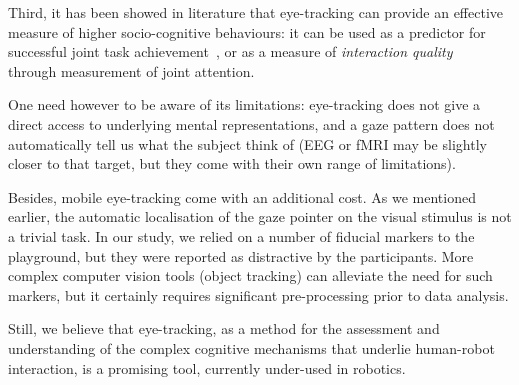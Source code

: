 \documentclass{sig-alternate}
\begin{document}
Third, it has been showed in literature that eye-tracking can provide an
effective measure of higher socio-cognitive behaviours: it can be used as a
predictor for successful joint task achievement~\cite{sharma2013understanding},
or as a measure of \emph{interaction quality}~\cite{jermann2012effects} through
measurement of joint attention.

One need however to be aware of its limitations: eye-tracking does not give a direct
access to underlying mental representations, and a gaze pattern does not
automatically tell us what the subject think of (EEG or fMRI may be slightly
closer to that target, but they come with their own range of limitations).

Besides, mobile eye-tracking come with an additional cost. As
we mentioned earlier, the automatic localisation of the gaze pointer on
the visual stimulus is not a trivial task. In our study, we relied on a 
number of fiducial markers to the playground, but they were reported as
distractive by the participants. More complex computer vision tools (object
tracking) can alleviate the need for such markers, but it certainly requires
significant pre-processing prior to data analysis.

Still, we believe that eye-tracking, as a method for the assessment and
understanding of the complex cognitive mechanisms that underlie human-robot
interaction, is a promising tool, currently under-used in robotics.



%




\balancecolumns
\end{document}
